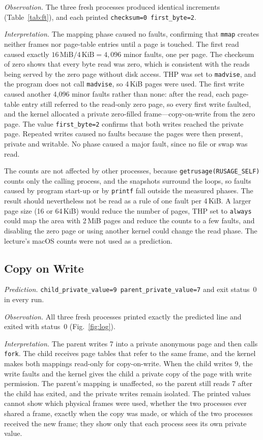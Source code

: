 \documentclass[conference,a4paper]{IEEEtran}
\newcommand{\code}[1]{\texttt{#1}}
\begin{document}
\emph{Observation.} The three fresh processes produced identical increments (Table~\ref{tab:ft}), and each printed \code{checksum=0 first\_byte=2}.

\emph{Interpretation.} The mapping phase caused no faults, confirming that \code{mmap} creates neither frames nor page-table entries until a page is touched. The first read caused exactly $16\,\mathrm{MiB} / 4\,\mathrm{KiB} = 4{,}096$ minor faults, one per page. The checksum of zero shows that every byte read was zero, which is consistent with the reads being served by the zero page without disk access. THP was set to \code{madvise}, and the program does not call \code{madvise}, so 4\,KiB pages were used. The first write caused another 4{,}096 minor faults rather than none: after the read, each page-table entry still referred to the read-only zero page, so every first write faulted, and the kernel allocated a private zero-filled frame---copy-on-write from the zero page. The value \code{first\_byte=2} confirms that both writes reached the private page. Repeated writes caused no faults because the pages were then present, private and writable. No phase caused a major fault, since no file or swap was read.

The counts are not affected by other processes, because \code{getrusage(RUSAGE\_SELF)} counts only the calling process, and the snapshots surround the loops, so faults caused by program start-up or by \code{printf} fall outside the measured phases. The result should nevertheless not be read as a rule of one fault per 4\,KiB. A larger page size (16 or 64\,KiB) would reduce the number of pages, THP set to \code{always} could map the area with 2\,MiB pages and reduce the counts to a few faults, and disabling the zero page or using another kernel could change the read phase. The lecture's macOS counts were not used as a prediction.

\subsection{Copy on Write}
\emph{Prediction.} \code{child\_private\_value=9 parent\_private\_value=7} and exit status~0 in every run.

\emph{Observation.} All three fresh processes printed exactly the predicted line and exited with status~0 (Fig.~\ref{fig:log}).

\emph{Interpretation.} The parent writes 7 into a private anonymous page and then calls \code{fork}. The child receives page tables that refer to the same frame, and the kernel makes both mappings read-only for copy-on-write. When the child writes 9, the write faults and the kernel gives the child a private copy of the page with write permission. The parent's mapping is unaffected, so the parent still reads 7 after the child has exited, and the private writes remain isolated. The printed values cannot show which physical frames were used, whether the two processes ever shared a frame, exactly when the copy was made, or which of the two processes received the new frame; they show only that each process sees its own private value.
\end{document}
